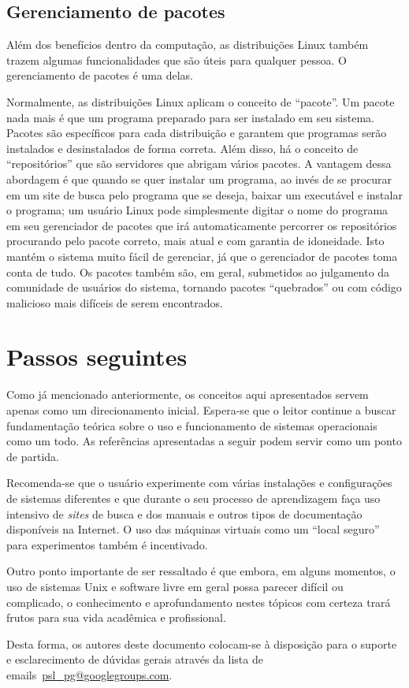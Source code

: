 \documentclass{handout_utfpr}
\begin{document}
\subsection{Gerenciamento de pacotes}
Além dos benefícios dentro da computação, as distribuições Linux também trazem algumas funcionalidades que são úteis para qualquer pessoa. O gerenciamento de pacotes é uma delas.

Normalmente, as distribuições Linux aplicam o conceito de ``pacote''. Um pacote nada mais é que um programa preparado para ser instalado em seu sistema. Pacotes são específicos para cada distribuição e garantem que programas serão instalados e desinstalados de forma correta. Além disso, há o conceito de ``repositórios'' que são servidores que abrigam vários pacotes. A vantagem dessa abordagem é que quando se quer instalar um programa, ao invés de se procurar em um site de busca pelo programa que se deseja, baixar um executável e instalar o programa; um usuário Linux pode simplesmente digitar o nome do programa em seu gerenciador de pacotes que irá automaticamente percorrer os repositórios procurando pelo pacote correto, mais atual e com garantia de idoneidade. Isto mantém o sistema muito fácil de gerenciar, já que o gerenciador de pacotes toma conta de tudo. Os pacotes também são, em geral, submetidos ao julgamento da comunidade de usuários do sistema, tornando pacotes ``quebrados'' ou com código malicioso mais difíceis de serem encontrados.

\section{Passos seguintes}
Como já mencionado anteriormente, os conceitos aqui apresentados servem apenas como um direcionamento inicial. Espera-se que o leitor continue a buscar fundamentação teórica sobre o uso e funcionamento de sistemas operacionais como um todo. As referências apresentadas a seguir podem servir como um ponto de partida.

Recomenda-se que o usuário experimente com várias instalações e configurações de sistemas diferentes e que durante o seu processo de aprendizagem faça uso intensivo de \textit{sites} de busca e dos manuais e outros tipos de documentação disponíveis na Internet. O uso das máquinas virtuais como um ``local seguro'' para experimentos também é incentivado.

Outro ponto importante de ser ressaltado é que embora, em alguns momentos, o uso de sistemas Unix e software livre em geral possa parecer difícil ou complicado, o conhecimento e aprofundamento nestes tópicos com certeza trará frutos para sua vida acadêmica e profissional.

Desta forma, os autores deste documento colocam-se à disposição para o suporte e esclarecimento de dúvidas gerais através da lista de emails~\url{psl_pg@googlegroups.com}.

\nocite{Tanenbaum:2007:MOS:1410217}
\nocite{shotts2012linux}
\nocite{anatomy2007}
\nocite{gnu.org}
\nocite{learn2012}
\nocite{linux2013}


\end{document}
